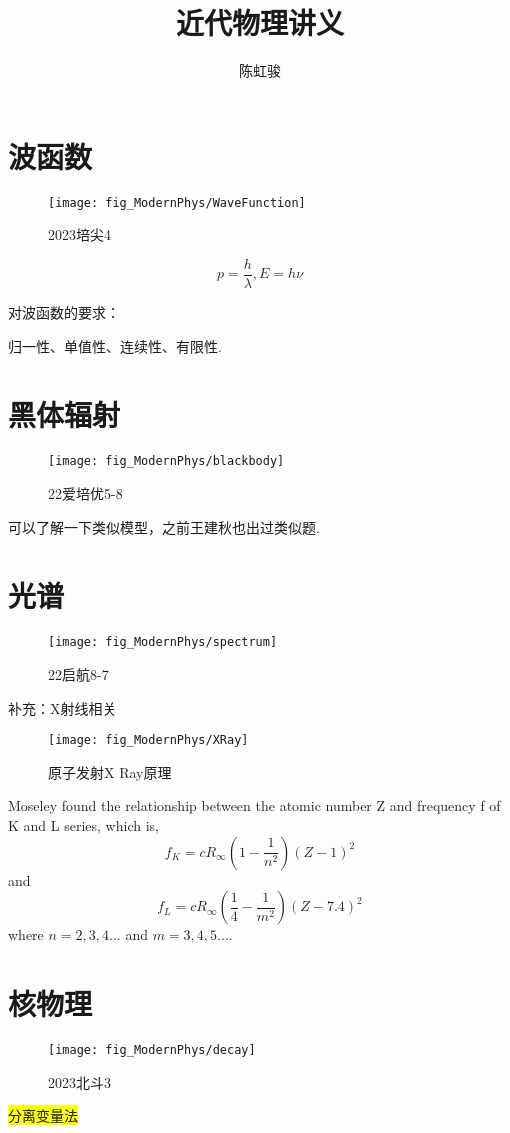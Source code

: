 \documentclass[a4paper]{article}
\title{近代物理讲义}
\author{陈虹骏}
\begin{document}
	\maketitle
	
	\section{波函数}
	\begin{figure}[H]
		\centering
		\texttt{[image: fig\_ModernPhys/WaveFunction]}
		\caption{2023培尖4}
		\label{fig:wavefunction}
	\end{figure}
	
	$$p=\frac{h}{ \lambda }, E=h\nu $$
	
	对波函数的要求：
	
	归一性、单值性、连续性、有限性.
	
	
	\section{黑体辐射}
	\begin{figure}[H]
		\centering
		\texttt{[image: fig\_ModernPhys/blackbody]}
		\caption{22爱培优5-8}
		\label{fig:blackbody}
	\end{figure}
	可以了解一下类似模型，之前王建秋也出过类似题.
	
	
	\section{光谱}
	\begin{figure}[H]
		\centering
		\texttt{[image: fig\_ModernPhys/spectrum]}
		\caption{22启航8-7}
		\label{fig:spectrum}
	\end{figure}
	
	补充：X射线相关
	\begin{figure}[H]
		\centering
		\texttt{[image: fig\_ModernPhys/XRay]}
		\caption{原子发射X Ray原理}
		\label{fig:xray}
	\end{figure}
	
	Moseley found the relationship between the atomic number Z and frequency f of K and L series, which is, $$f_K=cR_\infty(1-\frac{1}{n^2})(Z-1)^2$$and$$f_L=cR_\infty(\frac{1}{4}-\frac{1}{m^2})(Z-7.4)^2$$ where $n=2,3,4...$ and $m=3,4,5...$.
	
	
	\section{核物理}
	\begin{figure}[H]
		\centering
		\texttt{[image: fig\_ModernPhys/decay]}
		\caption{2023北斗3}
		\label{fig:decay}
	\end{figure}
	\colorbox{yellow}{分离变量法}
	
\end{document}
